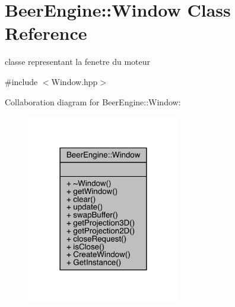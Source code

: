 \hypertarget{class_beer_engine_1_1_window}{}\section{Beer\+Engine\+:\+:Window Class Reference}
\label{class_beer_engine_1_1_window}


classe representant la fenetre du moteur  




{\ttfamily \#include $<$Window.\+hpp$>$}



Collaboration diagram for Beer\+Engine\+:\+:Window\+:\nopagebreak
\begin{figure}[H]
\begin{center}
\leavevmode
\includegraphics[width=189pt]{class_beer_engine_1_1_window__coll__graph}
\end{center}
\end{figure}
